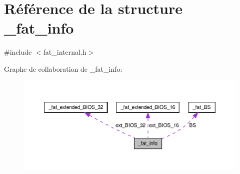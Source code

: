 \hypertarget{struct__fat__info}{\section{Référence de la structure \-\_\-fat\-\_\-info}
\label{struct__fat__info}
}


{\ttfamily \#include $<$fat\-\_\-internal.\-h$>$}



Graphe de collaboration de \-\_\-fat\-\_\-info\-:\nopagebreak
\begin{figure}[H]
\begin{center}
\leavevmode
\includegraphics[width=350pt]{struct__fat__info__coll__graph}
\end{center}
\end{figure}

